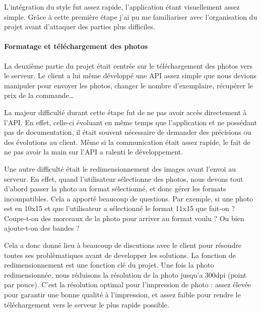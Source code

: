 \documentclass[12pt,a4paper]{article}
\begin{document}
  \bigskip

  L'intégration du style fut assez rapide, l'application étant
  visuellement assez simple. Grâce à cette première étape j'ai pu me
  familiariser avec l'organisation du projet avant d'attaquer des parties
  plus difficiles.

  \bigskip

  \paragraph{Formatage et téléchargement des
  photos}\label{formatage-et-tuxe9luxe9chargement-des-photos}

  \bigskip

  La deuxième partie du projet était centrée sur le téléchargement des
  photos vers le serveur. Le client a lui même développé une API assez
  simple que nous devions manipuler pour envoyer les photos, changer le
  nombre d'exemplaire, récupérer le prix de la commande\ldots{}

  \bigskip

  La majeur difficulté durant cette étape fut de ne pas avoir accès
  directement à l'API. En effet, celle-ci évoluant en même temps que
  l'application et ne possédant pas de documentation, il était souvent
  nécessaire de demander des précisions ou des évolutions au client. Même
  si la communication était assez rapide, le fait de ne pas avoir la main
  sur l'API a ralenti le développement.

  \bigskip

  Une autre difficulté était le redimensionnement des images avant l'envoi
  au serveur. En effet, quand l'utilisateur sélectionne des photos, nous
  devons tout d'abord passer la photo au format sélectionné, et donc gérer
  les formats incompatibles. Cela a apporté beaucoup de questions. Par
  exemple, si une photo est en 10x15 et que l'utilisateur a sélectionné le
  format 11x15 que fait-on ? Coupe-t-on des morceaux de la photo pour
  arriver au format voulu ? Ou bien ajoute-t-on des bandes ?

  \bigskip

  Cela a donc donné lieu à beaucoup de discutions avec le client pour
  résoudre toutes ses problèmatiques avant de developper les solutions. La
  fonction de redimensionnement est une fonction clé du projet. Une fois
  la photo redimensionnée, nous réduisons la résolution de la photo
  jusqu'a 300dpi (point par pouce). C'est la résolution optimal pour
  l'impression de photo : assez élevée pour garantir une bonne qualité à
  l'impression, et assez faible pour rendre le téléchargement vers le
  serveur le plus rapide possible.
\end{document}
